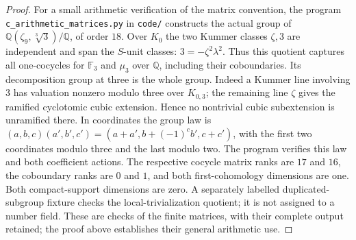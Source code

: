 \begin{proof}
For a small arithmetic verification of the matrix convention,
the program \texttt{c\_arithmetic\_matrices.py}
in \texttt{code/} constructs the actual
group of $\mathbb Q(\zeta_9,\sqrt[3]3)/\mathbb Q$, of order
$18$. Over $K_0$ the two Kummer classes $\zeta,3$ are
independent and span the $S$-unit classes: $3=-\zeta^2\lambda^2$.
Thus this quotient captures all one-cocycles for
$\mathbb F_3$ and $\mu_3$ over $\mathbb Q$, including
their coboundaries. Its decomposition group at three is
the whole group. Indeed a Kummer line involving $3$
has valuation nonzero modulo three over $K_{0,3}$;
the remaining line $\zeta$ gives the ramified cyclotomic
cubic extension. Hence no nontrivial cubic subextension
is unramified there. In coordinates the group law is
$(a,b,c)(a',b',c')=(a+a',b+(-1)^c b',c+c')$,
with the first two coordinates modulo three and the
last modulo two. The program verifies this law and
both coefficient actions. The respective cocycle
matrix ranks are $17$ and $16$, the coboundary ranks
are $0$ and $1$, and both first-cohomology dimensions
are one. Both compact-support dimensions are zero.
A separately labelled duplicated-subgroup fixture
checks the local-trivialization quotient; it is not
assigned to a number field. These are checks of the
finite matrices, with their complete output retained;
the proof above establishes their general arithmetic use.
\end{proof}

